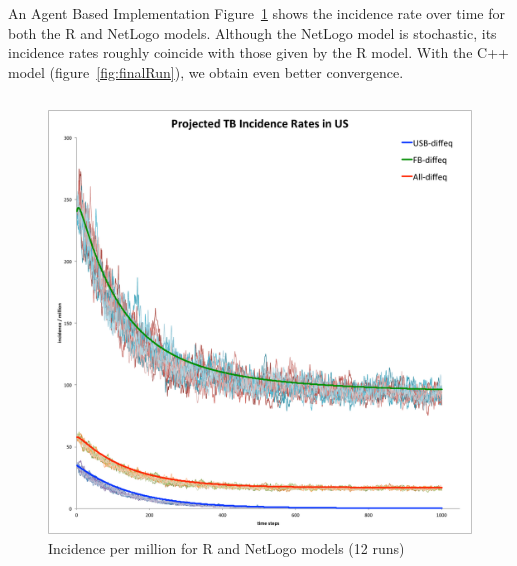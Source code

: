\documentclass[final]{beamer}
\begin{document}
\begin{frame}
\begin{columns}
\begin{column}{.3\textwidth}
\begin{block}{An Agent Based Implementation}
        Figure~\ref{fig:NLHMinc} shows the incidence rate over time for both
        the R and NetLogo models. Although the NetLogo model is stochastic, its
        incidence rates roughly coincide with those given by the R model. With the
        C++ model (figure~\ref{fig:finalRun}), we obtain even better convergence.
        \begin{block}{}
          \begin{column}{.45\textwidth}
            \begin{figure}[h]
              \begin{center}
                \includegraphics[width=\textwidth]{NLHMinc}
              \end{center}
              \caption{Incidence per million for R and NetLogo models (12 runs)}
              \label{fig:NLHMinc}
            \end{figure}
          \end{column}
          \begin{column}{.45\textwidth}
            \begin{figure}[h]
              \begin{center}

\end{center}
\end{figure}
\end{column}
\end{block}
\end{block}
\end{column}
\end{columns}
\end{frame}
\end{document}
